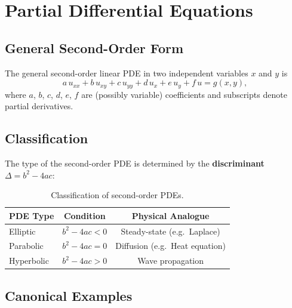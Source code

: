 \chapter{Partial Differential Equations}

\section{General Second-Order Form}

The general second-order linear PDE in two independent variables $x$ and $y$ is
\[
  a\,u_{xx} + b\,u_{xy} + c\,u_{yy} + d\,u_x + e\,u_y + f\,u = g(x,y),
\]
where $a$, $b$, $c$, $d$, $e$, $f$ are (possibly variable) coefficients and subscripts denote partial derivatives.

\section{Classification}

\begin{theorem}
The type of the second-order PDE is determined by the \textbf{discriminant} $\Delta = b^2 - 4ac$:
\end{theorem}

\begin{table}[h!]
\centering
\renewcommand{\arraystretch}{1.4}
\begin{tabular}{lcc}
\toprule
\textbf{PDE Type} & \textbf{Condition} & \textbf{Physical Analogue} \\
\midrule
Elliptic   & $b^2 - 4ac < 0$ & Steady-state (e.g.\ Laplace) \\
Parabolic  & $b^2 - 4ac = 0$ & Diffusion (e.g.\ Heat equation) \\
Hyperbolic & $b^2 - 4ac > 0$ & Wave propagation \\
\bottomrule
\end{tabular}
\caption{Classification of second-order PDEs.}
\end{table}

\section{Canonical Examples}

